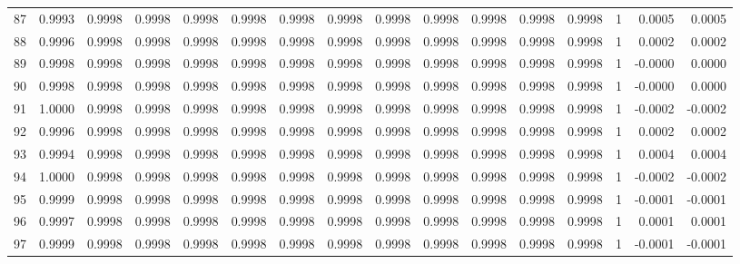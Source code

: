 \begin{tabular}{lrrrrrrrrrrrrrrr}
87  &      0.9993 &  0.9998 &  0.9998 &  0.9998 &  0.9998 &  0.9998 &  0.9998 &  0.9998 &  0.9998 &  0.9998 &   0.9998 &     0.9998 &      1 &                    0.0005 &                     0.0005 \\
88  &      0.9996 &  0.9998 &  0.9998 &  0.9998 &  0.9998 &  0.9998 &  0.9998 &  0.9998 &  0.9998 &  0.9998 &   0.9998 &     0.9998 &      1 &                    0.0002 &                     0.0002 \\
89  &      0.9998 &  0.9998 &  0.9998 &  0.9998 &  0.9998 &  0.9998 &  0.9998 &  0.9998 &  0.9998 &  0.9998 &   0.9998 &     0.9998 &      1 &                   -0.0000 &                     0.0000 \\
90  &      0.9998 &  0.9998 &  0.9998 &  0.9998 &  0.9998 &  0.9998 &  0.9998 &  0.9998 &  0.9998 &  0.9998 &   0.9998 &     0.9998 &      1 &                   -0.0000 &                     0.0000 \\
91  &      1.0000 &  0.9998 &  0.9998 &  0.9998 &  0.9998 &  0.9998 &  0.9998 &  0.9998 &  0.9998 &  0.9998 &   0.9998 &     0.9998 &      1 &                   -0.0002 &                    -0.0002 \\
92  &      0.9996 &  0.9998 &  0.9998 &  0.9998 &  0.9998 &  0.9998 &  0.9998 &  0.9998 &  0.9998 &  0.9998 &   0.9998 &     0.9998 &      1 &                    0.0002 &                     0.0002 \\
93  &      0.9994 &  0.9998 &  0.9998 &  0.9998 &  0.9998 &  0.9998 &  0.9998 &  0.9998 &  0.9998 &  0.9998 &   0.9998 &     0.9998 &      1 &                    0.0004 &                     0.0004 \\
94  &      1.0000 &  0.9998 &  0.9998 &  0.9998 &  0.9998 &  0.9998 &  0.9998 &  0.9998 &  0.9998 &  0.9998 &   0.9998 &     0.9998 &      1 &                   -0.0002 &                    -0.0002 \\
95  &      0.9999 &  0.9998 &  0.9998 &  0.9998 &  0.9998 &  0.9998 &  0.9998 &  0.9998 &  0.9998 &  0.9998 &   0.9998 &     0.9998 &      1 &                   -0.0001 &                    -0.0001 \\
96  &      0.9997 &  0.9998 &  0.9998 &  0.9998 &  0.9998 &  0.9998 &  0.9998 &  0.9998 &  0.9998 &  0.9998 &   0.9998 &     0.9998 &      1 &                    0.0001 &                     0.0001 \\
97  &      0.9999 &  0.9998 &  0.9998 &  0.9998 &  0.9998 &  0.9998 &  0.9998 &  0.9998 &  0.9998 &  0.9998 &   0.9998 &     0.9998 &      1 &                   -0.0001 &                    -0.0001 \\

\end{tabular}
